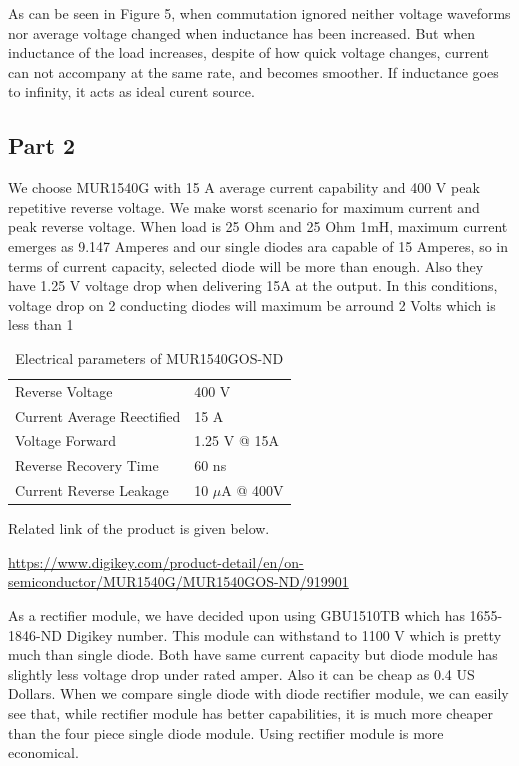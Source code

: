 \documentclass[fleqn, a4paper]{article}
\begin{document}
As can be seen in Figure 5, when commutation ignored neither voltage waveforms nor average voltage changed when inductance has been increased. But when inductance of the load increases, despite of how quick voltage changes, current can not accompany at the same rate, and becomes smoother. If inductance goes to infinity, it acts as ideal curent source.

\subsection*{Part 2}
We choose MUR1540G with 15 A average current capability and 400 V peak repetitive reverse voltage. We make worst scenario for maximum current and peak reverse voltage. 
When load is 25 Ohm and 25 Ohm 1mH, maximum current emerges as 9.147 Amperes and our single diodes ara capable of 15 Amperes, so in terms of current capacity, selected diode will be more than enough. Also they have 1.25 V voltage drop when delivering 15A at the output. In this conditions, voltage drop on 2 conducting diodes will maximum be arround 2 Volts which is less than 1%

\begin{table}[H]
\centering
\begin{tabular}{ll}

Reverse Voltage                   & 400 V               \\
Current Average Reectified        & 15 A                \\
Voltage Forward                   & 1.25 V @ 15A        \\
Reverse Recovery Time             & 60 ns       	\\
Current Reverse Leakage           & 10 $\mu$A  @ 400V         
\end{tabular}
\caption{Electrical parameters of MUR1540GOS-ND}
\end{table}
Related link of the product is given below.

\url {https://www.digikey.com/product-detail/en/on-semiconductor/MUR1540G/MUR1540GOS-ND/919901}

As a rectifier module, we have decided upon using GBU1510TB which has 1655-1846-ND Digikey number. This module can withstand to 1100 V which is pretty much than single diode. Both have same current capacity but diode module has slightly less voltage drop under rated amper. Also it can be cheap as 0.4 US Dollars. When we compare single diode with diode rectifier module, we can easily see that, while rectifier module has better capabilities, it is much more cheaper than the four piece single diode module. Using rectifier module is more economical.
\end{document}
